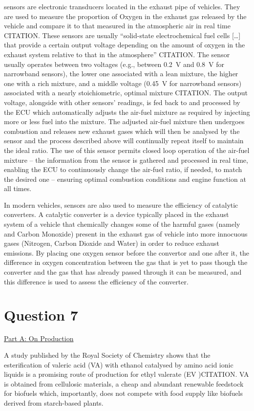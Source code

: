 \documentclass[11pt]{article}
\begin{document}
 sensors are electronic transducers located in the exhaust pipe of vehicles. They are used to measure the proportion of Oxygen in the exhaust gas released by the vehicle and compare it to that measured in the atmospheric air in real time CITATION. These sensors are usually “solid-state electrochemical fuel cells […] that provide a certain output voltage depending on the amount of oxygen in the exhaust system relative to that in the atmosphere” CITATION. The sensor usually operates between two voltages (e.g., between \SI{0.2}{\volt} and \SI{0.8}{\volt} for narrowband sensors), the lower one associated with a lean mixture, the higher one with a rich mixture, and a middle voltage (\SI{0.45}{\volt} for narrowband sensors) associated with a nearly stoichiometric, optimal mixture CITATION. The output voltage, alongside with other sensors’ readings, is fed back to and processed by the ECU which automatically adjusts the air-fuel mixture as required by injecting more or less fuel into the mixture. The adjusted air-fuel mixture then undergoes combustion and releases new exhaust gases which will then be analysed by the  sensor and the process described above will continually repeat itself to maintain the ideal ratio. The use of this sensor permits closed loop operation of the air-fuel mixture – the information from the sensor is gathered and processed in real time, enabling the ECU to continuously change the air-fuel ratio, if needed, to match the desired one – ensuring optimal combustion conditions and engine function at all times.

In modern vehicles,  sensors are also used to measure the efficiency of catalytic converters. A catalytic converter is a device typically placed in the exhaust system of a vehicle that chemically changes some of the harmful gases (namely  and Carbon Monoxide) present in the exhaust gas of vehicle into more innocuous gases (Nitrogen, Carbon Dioxide and Water) in order to reduce exhaust emissions. By placing one oxygen sensor before the convertor and one after it, the difference in oxygen concentration between the gas that is yet to pass though the converter and the gas that has already passed through it can be measured, and this difference is used to assess the efficiency of the converter.
\section*{Question 7}
{\centering
  \underline{Part A: On Production}\par
}
A study published by the Royal Society of Chemistry shows that the esterification of valeric acid (VA) with ethanol catalysed by amino acid ionic liquids is a promising route of production for ethyl valerate (EV )CITATION. VA is obtained from cellulosic materials, a cheap and abundant renewable feedstock for biofuels which, importantly, does not compete with food supply like biofuels derived from starch-based plants.
\end{document}

